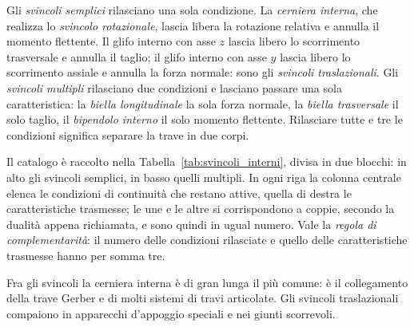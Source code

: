 Gli \emph{svincoli semplici}
rilasciano una sola condizione. La \emph{cerniera
	interna}, che realizza lo
\emph{svincolo rotazionale},
lascia libera la rotazione relativa e annulla il momento
flettente. Il glifo interno con asse $z$ lascia libero
lo scorrimento trasversale e annulla il taglio; il glifo
interno con asse $y$ lascia libero lo scorrimento assiale
e annulla la forza normale: sono gli \emph{svincoli
	traslazionali}.
Gli \emph{svincoli multipli}
rilasciano due condizioni e lasciano passare una sola
caratteristica: la \emph{biella longitudinale}
la sola forza normale, la \emph{biella trasversale}
il solo taglio, il \emph{bipendolo interno}
il solo momento flettente. Rilasciare tutte e tre le
condizioni significa separare la trave in due corpi.

Il catalogo è raccolto nella
Tabella~\ref{tab:svincoli_interni}, divisa in due
blocchi: in alto gli svincoli semplici, in basso quelli
multipli. In ogni riga la colonna centrale elenca le
condizioni di continuità che restano attive, quella di
destra le caratteristiche trasmesse; le une e le altre si
corrispondono a coppie, secondo la dualità appena
richiamata, e sono quindi in ugual numero. Vale la
\emph{regola di complementarità}:
il numero delle condizioni rilasciate e quello delle
caratteristiche trasmesse hanno per somma tre.

Fra gli svincoli la cerniera interna è di gran lunga il
più comune: è il collegamento della trave Gerber e di
molti sistemi di travi articolate. Gli svincoli
traslazionali compaiono in apparecchi d'appoggio speciali
e nei giunti scorrevoli.


